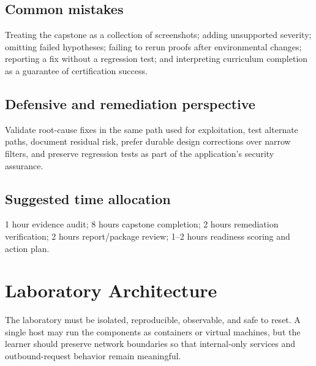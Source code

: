 \documentclass[11pt]{article}
\newcommand{\weekfield}[2]{%
  \Needspace{5\baselineskip}
  \subsection*{#1}
  #2
}
\begin{document}
\weekfield{Common mistakes}{Treating the capstone as a collection of screenshots;
adding unsupported severity; omitting failed hypotheses; failing to rerun proofs
after environmental changes; reporting a fix without a regression test; and
interpreting curriculum completion as a guarantee of certification success.}

\weekfield{Defensive and remediation perspective}{Validate root-cause fixes in the
same path used for exploitation, test alternate paths, document residual risk,
prefer durable design corrections over narrow filters, and preserve regression
tests as part of the application's security assurance.}

\weekfield{Suggested time allocation}{1 hour evidence audit; 8 hours capstone
completion; 2 hours remediation verification; 2 hours report/package review;
1--2 hours readiness scoring and action plan.}

\clearpage
\section{Laboratory Architecture}

The laboratory must be isolated, reproducible, observable, and safe to reset. A
single host may run the components as containers or virtual machines, but the
learner should preserve network boundaries so that internal-only services and
outbound-request behavior remain meaningful.
\end{document}
